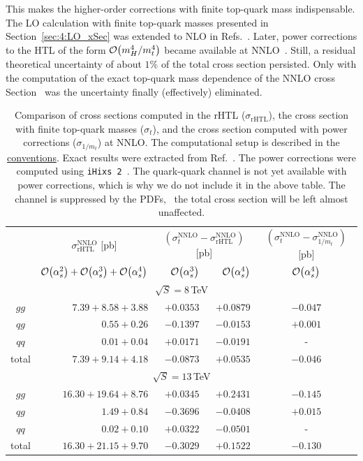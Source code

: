 This makes the higher-order corrections with finite top-quark mass indispensable. The \acs{LO} calculation with finite top-quark masses presented in Section~\ref{sec:4:LO_xSec} was extended to \acs{NLO} in Refs.~\cite{Djouadi:1991tka, Graudenz:1992pv}. Later, power corrections to the \acs{HTL} of the form $\mathcal{O}\!\left(m_H^4/m_t^4\right)$ became available at \acs{NNLO}~\cite{Harlander:2009mq, Harlander:2009my, Pak:2009dg}. Still, a residual theoretical uncertainty of about $1\%$ of the total cross section persisted. Only with the computation of the exact top-quark mass dependence of the \acs{NNLO} cross Section~\cite{Czakon:2021yub} was the uncertainty finally (effectively) eliminated.
\begin{table}[t!]

\centering
\begin{tabular}{c|r|rr|c}
\hline
\rule{0pt}{1em}
\multirow{2}{*}{channel} & \multicolumn{1}{c|}{$\sigma^\mathrm{NNLO}_\mathrm{rHTL}$ [pb]} &
\multicolumn{2}{c|}{$(\sigma^\mathrm{NNLO}_t-
\sigma^\mathrm{NNLO}_\mathrm{rHTL})$ [pb]} &
$(\sigma^\mathrm{NNLO}_t- \sigma^\mathrm{NNLO}_{1/m_t})$ [pb] \\
& $\mathcal{O}\!\left(\alpha_s^2\right)+\mathcal{O}\!\left(\alpha_s^3\right)+\mathcal{O}\!\left(\alpha_s^4\right)$ & \multicolumn{1}{r}{$\mathcal{O}\!\left(\alpha_s^3\right)$} & \multicolumn{1}{r|}{$\mathcal{O}\!\left(\alpha_s^4\right)$} & $\mathcal{O}\!\left(\alpha_s^4\right)$ \\
\hline
\multicolumn{5}{c}{\rule{0pt}{1em}$\sqrt{S} = 8$\,TeV}\\\hline
$gg$ & $7.39 + 8.58 + 3.88$ &  $+0.0353$ & $+0.0879$ & $-0.047$ \\
$qg$ & $0.55 + 0.26$ & $-0.1397$ & $-0.0153$ & $+0.001 $\\
$qq$ & $0.01 + 0.04$ & $+0.0171$ & $-0.0191$ & - \\\hline
total & $7.39 + 9.14 + 4.18$ &  $-0.0873$ & $+0.0535$ & $-0.046$ \\
\hline
\multicolumn{5}{c}{\rule{0pt}{1em}$\sqrt{S} = 13$\,TeV}\\\hline
$gg$ & $16.30 + 19.64 + 8.76$ & $+0.0345$ & $+0.2431$ & $-0.145$ \\
$qg$ & $1.49 + 0.84$ & $-0.3696$ & $-0.0408$ & $+0.015$ \\
$qq$ & $0.02 + 0.10$ & $+0.0322$ & $-0.0501$ & - \\\hline
total & $16.30 + 21.15 + 9.70$ & $-0.3029$ & $+0.1522$ & $-0.130$ \\
\hline
\end{tabular}
\caption{Comparison of cross sections computed in the \acs{rHTL} ($\sigma_\mathrm{rHTL}$), the cross section with finite top-quark masses ($\sigma_{t}$), and the cross section computed with power corrections ($\sigma_{1/m_t}$) at \acs{NNLO}. The computational setup is described in the \hyperref[chap:notation_and_conventions]{conventions}. Exact results were extracted from Ref.~\cite{Czakon:2021yub}. The power corrections were computed using \texttt{iHixs 2}~\cite{Dulat:2018rbf}. The quark-quark channel is not yet available with power corrections, which is why we do not include it in the above table. The channel is suppressed by the \acs{PDF}s, \ie\ the total cross section will be left almost unaffected.} \label{tab:4:finite_top_quark_mass_effects}
\end{table}

